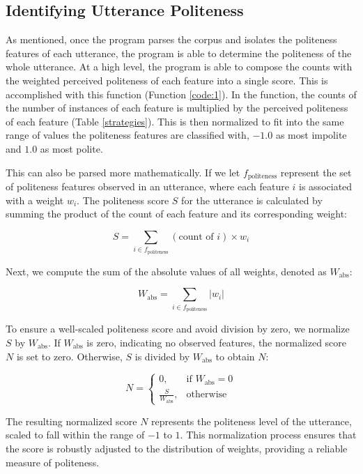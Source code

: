 \documentclass{article}
\begin{document}
\subsection{Identifying Utterance Politeness}
As mentioned, once the program parses the corpus and isolates the politeness features of each utterance, the program is able to determine the politeness of the whole utterance. At a high level, the program is able to compose the counts with the weighted perceived politeness of each feature into a single score. This is accomplished with this function (Function \ref{code:1}). In the function, the counts of the number of instances of each feature is multiplied by the perceived politeness of each feature (Table \ref{strategies}). This is then normalized to fit into the same range of values the politeness features are classified with, $-1.0$ as most impolite and $1.0$ as most polite. 

This can also be parsed more mathematically. If we let \( f_{\text{politeness}} \) represent the set of politeness features observed in an utterance, where each feature \( i \) is associated with a weight \( w_i \). The politeness score \( S \) for the utterance is calculated by summing the product of the count of each feature and its corresponding weight:

\[
S = \sum_{i \in f_{\text{politeness}}} (\text{{count of }} i) \times w_i
\]

Next, we compute the sum of the absolute values of all weights, denoted as \( W_{\text{abs}} \):

\[
W_{\text{abs}} = \sum_{i \in f_{\text{politeness}}} |w_i|
\]

To ensure a well-scaled politeness score and avoid division by zero, we normalize \( S \) by \( W_{\text{abs}} \). If \( W_{\text{abs}} \) is zero, indicating no observed features, the normalized score \( N \) is set to zero. Otherwise, \( S \) is divided by \( W_{\text{abs}} \) to obtain \( N \):

\[
N = \begin{cases}
0, & \text{if } W_{\text{abs}} = 0 \\
\frac{S}{W_{\text{abs}}}, & \text{otherwise}
\end{cases}
\]

The resulting normalized score \( N \) represents the politeness level of the utterance, scaled to fall within the range of $-1$ to $1$. This normalization process ensures that the score is robustly adjusted to the distribution of weights, providing a reliable measure of politeness.
\end{document}

